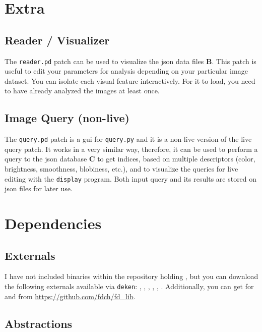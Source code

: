\section{Extra}


\subsection{Reader / Visualizer}

The \texttt{reader.pd} patch can be used to visualize the \gls{json} data files \textbf{B}. This patch is useful to edit your parameters for analysis depending on your particular image dataset. You can isolate each visual feature interactively. For it to load, you need to have already analyzed the images at least once. 

\subsection{Image Query (non-live)}

The \texttt{query.pd} patch is a gui for \texttt{query.py} and it is a non-live version of the live query patch. It works in a very similar way, therefore, it can be used to perform a query to the \gls{json} database \textbf{C} to get indices, based on multiple descriptors (color, brightness, smoothness, blobiness, etc.), and to  visualize the queries for live editing with the \texttt{display} program. Both input query and its results are stored on \gls{json} files for later use. 


\section{Dependencies}


\subsection{Externals}

I have not included binaries within the repository holding , but you can download the following externals available via \texttt{deken}: , , , , , . Additionally, you can get  for  and  from \url{https://github.com/fdch/fd_lib}.

\subsection{Abstractions}

